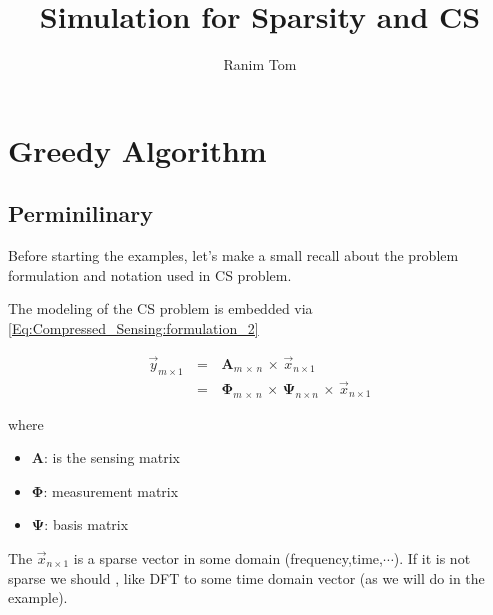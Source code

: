 \documentclass[12pt,a4paper]{book}
\title{Simulation for Sparsity and CS}
\author{Ranim Tom}
\begin{document}
% 

\maketitle
\tableofcontents

\listoftodos


\pagestyle{fancy}
\fancyhf{} %
\rhead{\rightmark}

\chapter{Greedy Algorithm}


\section{Perminilinary}

Before starting the examples, let's make a small recall about the problem formulation and notation used in CS problem.

The modeling of the CS problem is embedded via \autoref{Eq:Compressed_Sensing:formulation_2}

\begin{equation}
	\begin{array}{rcl}
 \Vec{y}_{m \times 1} \, &=& \, \boldsymbol A_{m \, \times \, n} \,\times \,  \Vec{x}_{n \times 1} \\ 
		 &=& \, \boldsymbol \Phi_{m \, \times \, n} \, \times \, \boldsymbol \Psi_{n \times n} \, \times \, \Vec{x}_{n \times 1}
	\end{array}
\label{Eq:Compressed_Sensing:formulation_2}
\end{equation}

where

\begin{itemize}
    \item $\boldsymbol A$: is the sensing matrix
    
    \item $ \boldsymbol \Phi$: measurement matrix
    
    \item $ \boldsymbol \Psi$: basis matrix
    
\end{itemize}

The $\Vec{x}_{n \times 1}$ is a sparse vector in some domain (frequency,time,$\cdots$). If it is not sparse we should , like DFT to some time domain vector (as we will do in the example).\\
\end{document}
